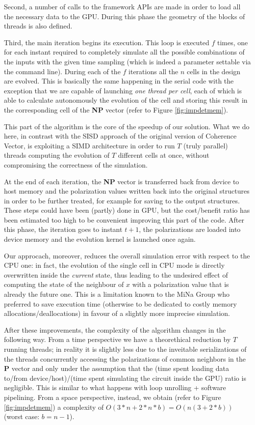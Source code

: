 Second, a number of calls to the framework APIs are made in order to load all the necessary data to the GPU. During this phase the geometry of the blocks of threads is also defined.

Third, the main iteration begins its execution. This loop is executed $f$ times, one for each instant required to completely simulate all the possible combinations of the inputs with the given time sampling (which is indeed a parameter settable via the command line). During each of the $f$ iterations all the $n$ cells in the design are evolved. This is basically the same happening in the serial code with the exception that we are capable of launching \textsl{one thread per cell}, each of which is able to calculate autonomously the evolution of the cell and storing this result in the corresponding cell of the \textbf{NP} vector (refer to Figure \ref{fig:impdetmem}). 

This part of the algorithm is the core of the speedup of our solution. What we do here, in contrast with the SISD approach of the original version of Coherence Vector, is exploiting a SIMD architecture in order to run $T$ (truly parallel) threads computing the evolution of $T$ different cells at once, without compromising the correctness of the simulation.

At the end of each iteration, the \textbf{NP} vector is transferred back from device to host memory and the polarization values written back into the original structures in order to be further treated, for example for saving to the output structures. These steps could have been (partly) done in GPU, but the cost\slash benefit ratio has been estimated too high to be convenient improving this part of the code. After this phase, the iteration goes to instant $t+1$, the polarizations are loaded into device memory and the evolution kernel is launched once again.

Our approcach, moreover, reduces the overall simulation error with respect to the CPU one: in fact, the evolution of the single cell in CPU mode is directly overwritten inside the \textsl{current} state, thus leading to the undesired effect of computing the state of the neighbour of $x$ with a polarization value that is already the future one. This is a limitation known to the MiNa Group who preferred to save execution time (otherwise to be dedicated to costly memory allocations/deallocations) in favour of a slightly more imprecise simulation.

After these improvements, the complexity of the algorithm changes in the following way. From a time perspective we have a theorethical reduction by $T$ running threads; in reality it is slightly less due to the inveitable serializations of the threads concurrently accessing the polarizations of common neighbors in the \textbf{P} vector and only under the assumption that the (time spent loading data to/from device/host)/(time spent simulating the circuit inside the GPU) ratio is negligible. This is similar to what happens with loop unrolling + software pipelining. From a space perspective, instead, we obtain (refer to Figure \ref{fig:impdetmem}) a complexity of $O(3*n+2*n*b)=O(n(3+2*b))$ (worst case: $b=n-1$).
